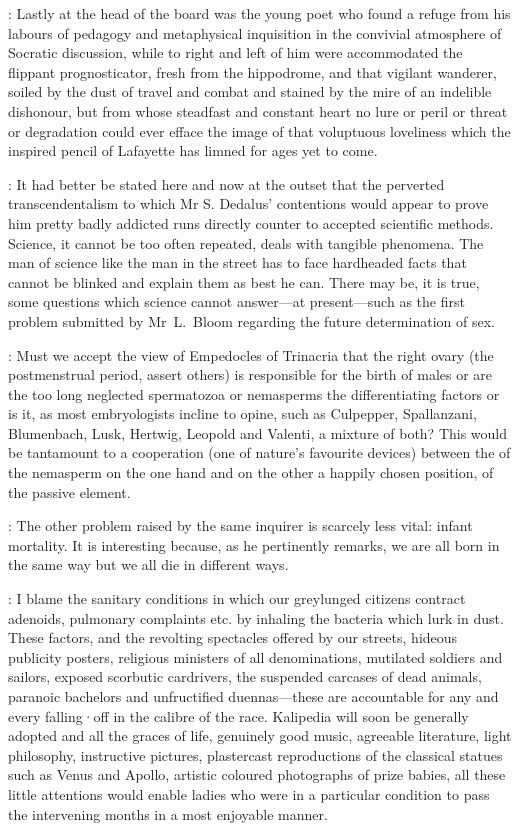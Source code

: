 :
Lastly at the head of the board was the young poet who found a
refuge from his labours of pedagogy and metaphysical inquisition in the
convivial atmosphere of Socratic discussion,
while to right and left of
him were accommodated the flippant prognosticator,
fresh from the
hippodrome,
and that vigilant wanderer,
soiled by the dust of travel and
combat and stained by the mire of an indelible dishonour,
but from whose
steadfast and constant heart no lure or peril or threat or degradation
could ever efface the image of that voluptuous loveliness which the
inspired pencil of Lafayette has limned for ages yet to come.



:
It had better be stated here and now at the outset that the perverted
transcendentalism to which Mr S. Dedalus' contentions would
appear to prove him pretty badly addicted runs directly counter to
accepted scientific methods.
Science,
it cannot be too often repeated,
deals with tangible phenomena.
The man of science like the man in the
street has to face hardheaded facts that cannot be blinked and explain
them as best he can.
There may be,
it is true,
some questions which
science cannot answer---at present---such as the first problem submitted by
Mr~L.~Bloom
regarding the future determination of sex.

:
Must we accept the view of Empedocles of Trinacria
that the right ovary
(the postmenstrual period,
assert others)
is responsible for the birth of males or
are the too long neglected spermatozoa or nemasperms the
differentiating factors or is it,
as most embryologists incline to opine,
such as Culpepper,
Spallanzani,
Blumenbach,
Lusk,
Hertwig,
Leopold and
Valenti,
a mixture of both?
This would be tantamount to a cooperation
(one of nature's favourite devices) between
the  of the
nemasperm on the one hand and on the other a happily chosen position,
 of the passive element.

:
The other problem raised by the same inquirer is scarcely less vital:
infant mortality.
It is interesting because,
as he pertinently remarks,
we
are all born in the same way but we all die in different ways.

\mulligan:
I blame the sanitary conditions in which our greylunged citizens
contract adenoids,
pulmonary complaints etc.
by inhaling the bacteria
which lurk in dust.
These factors,
and the revolting spectacles offered by
our streets,
hideous publicity posters,
religious ministers of all
denominations,
mutilated soldiers and sailors,
exposed scorbutic
cardrivers,
the suspended carcases of dead animals,
paranoic bachelors and
unfructified duennas---these are accountable
for any and every falling·off in the calibre of the race.
Kalipedia will soon be generally adopted and
all the graces of life,
genuinely good music,
agreeable literature,
light
philosophy,
instructive pictures,
plastercast reproductions of the
classical statues such as Venus and Apollo,
artistic coloured photographs
of prize babies,
all these little attentions would enable ladies who were
in a particular condition to pass the intervening months in a most
enjoyable manner.

